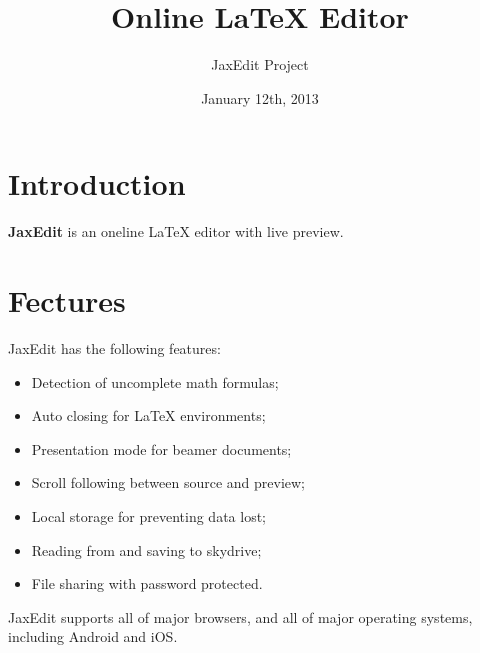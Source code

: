 \documentclass{article}
\begin{document}
\title{Online LaTeX Editor}
\author{JaxEdit Project}
\date{January 12th, 2013}

\maketitle
\tableofcontents

\section{Introduction}

\textbf{JaxEdit} is an oneline LaTeX editor with live preview.

\section{Fectures}

JaxEdit has the following features:
\begin{itemize}
\item Detection of uncomplete math formulas;
\item Auto closing for LaTeX environments;
\item Presentation mode for beamer documents;
\item Scroll following between source and preview;
\item Local storage for preventing data lost;
\item Reading from and saving to skydrive;
\item File sharing with password protected.
\end{itemize}

JaxEdit supports all of major browsers, and all of major operating systems, including Android and iOS.
\end{document}

